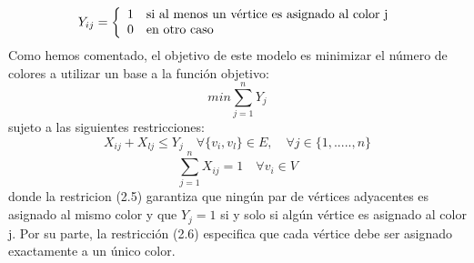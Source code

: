 \documentclass[12pt]{report}
\begin{document}
\begin{equation}
     Y_{ij} = \left\{
	       \begin{array}{ll}
			1 	& 	$si al menos un vértice es asignado al color j$\\
			0   &	$en otro caso$\\
	       \end{array}
	     \right.
\end{equation}
Como hemos comentado, el objetivo de este modelo es minimizar el número de colores a utilizar un base a la función objetivo:
\begin{equation}
min \sum_{j=1}^n Y_j
\end{equation}
sujeto a las siguientes restricciones:
\begin{equation}
X_{ij} + X_{lj} \leq Y_j \quad \forall \{v_i,v_l\} \in E, \quad \forall j \in \{1,.....,n\}
\end{equation}
\begin{equation}
 \sum_{j=1}^{n} X_{ij} = 1  \quad \forall v_i \in V
\end{equation}
donde la restricion (2.5) garantiza que ningún par de vértices adyacentes es asignado al mismo color y que $Y_j = 1$ si y solo si algún vértice es asignado al color j. Por su parte, la restricción (2.6) especifica que cada vértice debe ser asignado exactamente a un único color.

\end{document}
